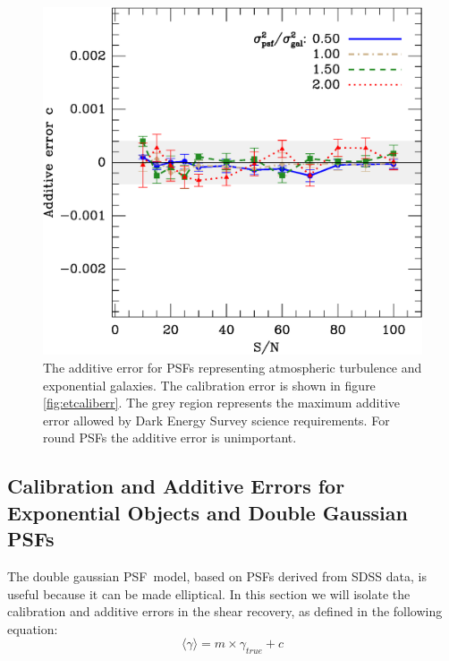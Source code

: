 \documentclass[10pt,preprint]{aastex}
\newcommand{\psf}{PSF}
\begin{document}
\begin{figure}[t] \centering
 \centering 
 \includegraphics[scale=0.65]{figures/set-s2n-et02-c-vs-shear.eps}

 \caption{The additive error for \psf s representing atmospheric turbulence and
 exponential galaxies.  The calibration error is shown in figure
 \ref{fig:etcaliberr}.  The grey region represents the maximum additive error
 allowed by Dark Energy Survey science requirements.  For round \psf s the
 additive error is unimportant. } 

 \label{fig:etverifyadditive}
\end{figure}





\subsection{Calibration and Additive Errors for Exponential Objects and Double
Gaussian \psf s}

The double gaussian \psf\ model, based on \psf s derived from SDSS data, is
useful because it can be made elliptical.  In this section we will isolate the
calibration and additive errors in the shear recovery, as defined in the
following equation:
\begin{equation}
\langle \gamma \rangle = m\times \gamma_{true} + c
\end{equation}
\end{document}
